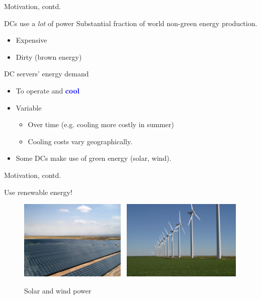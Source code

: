 \documentclass[xcolor=dvipsnames]{beamer}
\begin{document}
\begin{frame}{Motivation, contd.}
	\begin{block}{DCs use a \emph{lot} of power} 
		Substantial fraction of world non-green energy production.
		\begin{itemize}
			\item {Expensive}
			\item {Dirty (brown energy)}
		\end{itemize}	
	\end{block}

	\begin{block}{DC servers' energy demand} \vspace{-1mm}
		\begin{itemize}
		          \item{To operate and \textbf{\textcolor{blue}{cool}}}
			\item{Variable}
				\begin{itemize} 
					\item {Over time (e.g. cooling more costly in summer)}  %
					\item{Cooling costs vary geographically.}
		 		\end{itemize}				
			\item{Some DCs make use of green energy (solar, wind).}
		\end{itemize}
 	\end{block}
\end{frame}

\begin{frame}{Motivation, contd.}
	\begin{block}{Use renewable energy!}
		\begin{figure}
			\centering
			\includegraphics[height=1.5in]{PanSol2.jpg}~
			\includegraphics[height=1.5in]{GreenMountainWindFarm_Fluvanna_2004.jpg}
			\caption{Solar and wind power}
		\end{figure}
	\end{block}
\end{frame}
\end{document}
